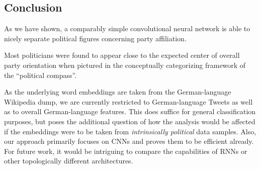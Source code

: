 \documentclass[10pt, oneside]{article}
\begin{document}
\begin{multicols}{2}
\section{Conclusion}

As we have shown, a comparably simple convolutional neural network is able to nicely separate political figures concerning party affiliation.

Most politicians were found to appear close to the expected center of overall party orientation when pictured in the conceptually categorizing framework of the ``political compass''.

As the underlying word embeddings are taken from the German-language Wikipedia dump, we are currently restricted to German-language Tweets as well as to overall German-language features. This does suffice for general classification purposes, but poses the additional question of how the analysis would be affected if the embeddings were to be taken from \emph{intrinsically political} data samples. 
Also, our approach primarily focuses on CNNs and proves them to be efficient already. For future work, it would be intriguing to compare the capabilities of RNNs or other topologically different architectures. 

\end{multicols}

\newpage



\end{document}
